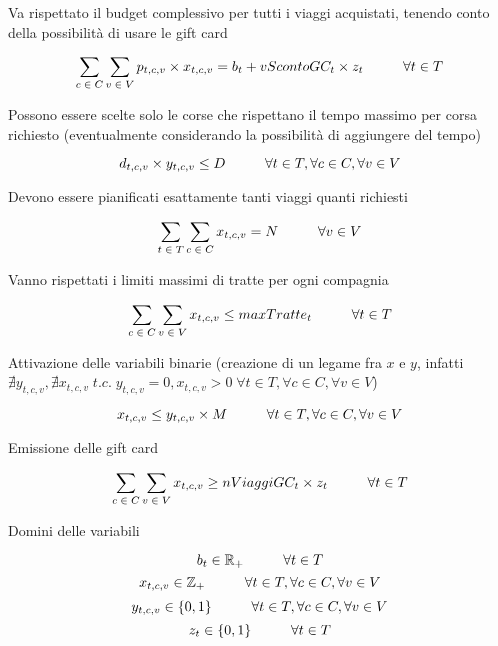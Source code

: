 \documentclass[main.tex]{subfiles}
\begin{document}
Va rispettato il budget complessivo per tutti i viaggi acquistati, tenendo conto della possibilità di usare le gift card
\begin{tcolorbox}
$$\sum_{c\; \in\; C} \sum_{v\; \in\; V} p_{t,c,v} \times{} x_{t,c,v} = b_t + vScontoGC_t \times{} z_t \hspace{10mm} \forall{} t \in T$$
\end{tcolorbox}

Possono essere scelte solo le corse che rispettano il tempo massimo per corsa richiesto (eventualmente considerando la possibilità di aggiungere del tempo)
\begin{tcolorbox}
$$d_{t,c,v} \times{} y_{t,c,v} \leq D \hspace{10mm} \forall{} t \in T, \forall{} c \in C, \forall{} v \in V$$
\end{tcolorbox}

Devono essere pianificati esattamente tanti viaggi quanti richiesti
\begin{tcolorbox}
$$\sum_{t\; \in\; T} \sum_{c\; \in\; C} x_{t,c,v} = N \hspace{10mm} \forall{} v \in V$$
\end{tcolorbox}

Vanno rispettati i limiti massimi di tratte per ogni compagnia
\begin{tcolorbox}
$$\sum_{c\; \in\; C} \sum_{v\; \in\; V} x_{t,c,v} \leq maxTratte_t \hspace{10mm} \forall{} t \in T$$
\end{tcolorbox}

Attivazione delle variabili binarie (creazione di un legame fra $x$ e $y$, infatti $\nexists y_{t,c,v}, \nexists x_{t,c,v}\; t.c.\; y_{t,c,v} = 0, x_{t,c,v} > 0\; \forall{} t \in T, \forall{} c \in C, \forall{} v \in V$)
\begin{tcolorbox}
$$x_{t,c,v} \leq y_{t,c,v} \times{} M \hspace{10mm} \forall{} t \in T, \forall{} c \in C, \forall{} v \in V$$
\end{tcolorbox}

Emissione delle gift card
\begin{tcolorbox}
$$\sum_{c\; \in\; C} \sum_{v\; \in\; V} x_{t,c,v} \geq nViaggiGC_t \times z_t \hspace{10mm} \forall{} t \in T$$
\end{tcolorbox}

Domini delle variabili
\begin{tcolorbox}
$$b_t \in \mathbb{R}_+ \hspace{10mm} \forall{} t \in T$$
$$x_{t,c,v} \in \mathbb{Z}_+ \hspace{10mm} \forall{} t \in T, \forall{} c \in C, \forall{} v \in V$$
$$y_{t,c,v} \in \{0,1\} \hspace{10mm} \forall{} t \in T, \forall{} c \in C, \forall{} v \in V$$
$$z_t \in \{0,1\} \hspace{10mm} \forall{} t \in T$$
\end{tcolorbox}
\end{document}
